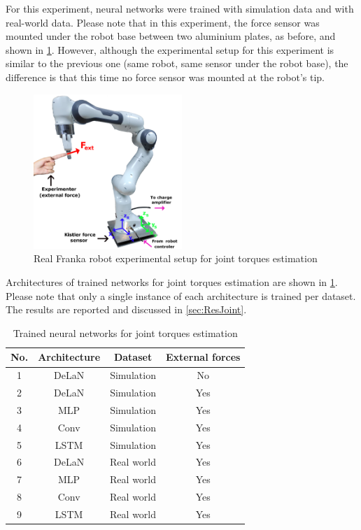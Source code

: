 For this experiment, neural networks were trained with simulation data and with real-world data. Please note that in this experiment, the force sensor was mounted under the robot base between two aluminium plates, as before, and shown in \cref{fig:FrankaTorqueSetup}. However, although the experimental setup for this experiment is similar to the previous one (same robot, same sensor under the robot base), the difference is that this time no force sensor was mounted at the robot's tip.

\begin{figure}
    \centering
    \includegraphics[width=0.5\textwidth]{slike/franka_torque.png}
    \caption{Real Franka robot experimental setup for joint torques estimation}
    \label{fig:FrankaTorqueSetup}
\end{figure}

Architectures of trained networks for joint torques estimation are shown in \cref{tab:NetworksFrankaTorque}. Please note that only a single instance of each architecture is trained per dataset. The results are reported and discussed in \cref{sec:ResJoint}.

\begin{table}
    \centering
    \caption{Trained neural networks for joint torques estimation}
    \label{tab:NetworksFrankaTorque}
    \begin{tabular}{cccc}
        \toprule
        \textbf{No.} & \textbf{Architecture} & \textbf{Dataset} & \textbf{External forces} \\
        \midrule
        1 & DeLaN & Simulation & No \\ %
        2 & DeLaN & Simulation & Yes \\ %
        3 & MLP & Simulation & Yes \\ %
        4 & Conv & Simulation & Yes\\ %
        5 & LSTM & Simulation & Yes \\ %
        \midrule
        6 & DeLaN & Real world & Yes \\ %
        7 & MLP & Real world & Yes\\%
        8 & Conv & Real world & Yes\\ %
        9 & LSTM & Real world & Yes\\ %
        \bottomrule
    \end{tabular}
\end{table}

